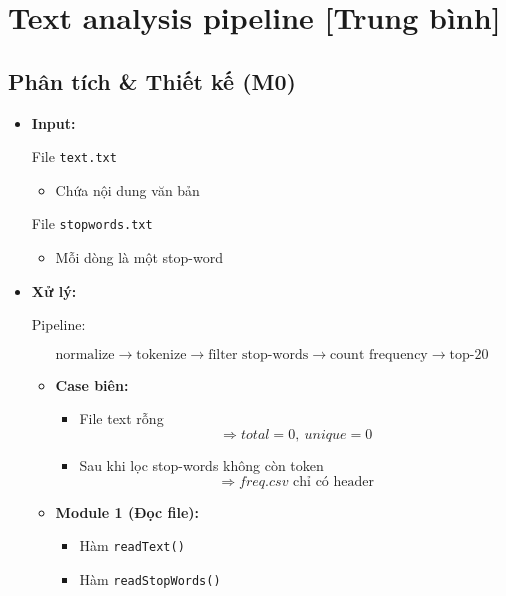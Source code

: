 \section{Text analysis pipeline [Trung bình]}
\subsection{Phân tích \& Thiết kế (M0)}

\begin{itemize}

    \item \textbf{Input:}

    File \texttt{text.txt}

    \begin{itemize}
        \item Chứa nội dung văn bản
    \end{itemize}

    File \texttt{stopwords.txt}

    \begin{itemize}
        \item Mỗi dòng là một stop-word
    \end{itemize}

    \item \textbf{Xử lý:}

    Pipeline:

\[
\text{normalize}
\rightarrow
\text{tokenize}
\rightarrow
\text{filter stop-words}
\rightarrow
\text{count frequency}
\rightarrow
\text{top-20}
\]

    \begin{itemize}

        \item \textbf{Case biên:}

        \begin{itemize}
            \item File text rỗng
            \[
                \Rightarrow total=0,\ unique=0
            \]

            \item Sau khi lọc stop-words không còn token
            \[
                \Rightarrow freq.csv \text{ chỉ có header}
            \]
        \end{itemize}

        \item \textbf{Module 1 (Đọc file):}

        \begin{itemize}
            \item Hàm \texttt{readText()}
            \item Hàm \texttt{readStopWords()}
        \end{itemize}


\end{itemize}
\end{itemize}
